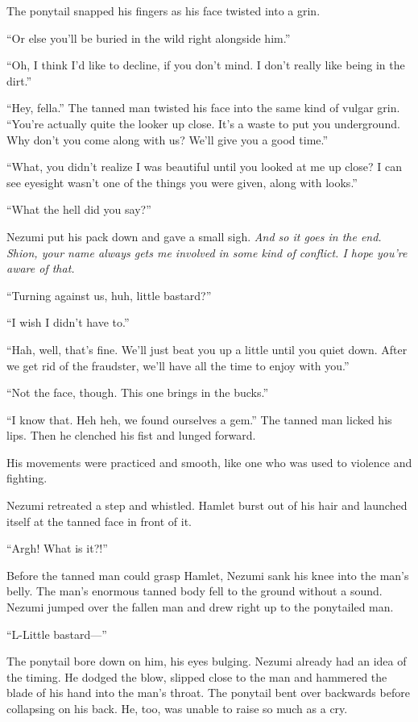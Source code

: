 The ponytail snapped his fingers as his face twisted into a grin.

``Or else you'll be buried in the wild right alongside him.''

``Oh, I think I'd like to decline, if you don't mind. I don't really
like being in the dirt.''

``Hey, fella.'' The tanned man twisted his face into the same kind of
vulgar grin. ``You're actually quite the looker up close. It's a waste
to put you underground. Why don't you come along with us? We'll give you
a good time.''

``What, you didn't realize I was beautiful until you looked at me up
close? I can see eyesight wasn't one of the things you were given, along
with looks.''

``What the hell did you say?''

Nezumi put his pack down and gave a small sigh. \emph{And so it goes in the
end. Shion, your name always gets me involved in some kind of conflict.
I hope you're aware of that.}

``Turning against us, huh, little bastard?''

``I wish I didn't have to.''

``Hah, well, that's fine. We'll just beat you up a little until you
quiet down. After we get rid of the fraudster, we'll have all the time
to enjoy with you.''

``Not the face, though. This one brings in the bucks.''

``I know that. Heh heh, we found ourselves a gem.'' The tanned man
licked his lips. Then he clenched his fist and lunged forward.~

His movements were practiced and smooth, like one who was used to
violence and fighting.

Nezumi retreated a step and whistled. Hamlet burst out of his hair and
launched itself at the tanned face in front of it.

``Argh! What is it?!''

Before the tanned man could grasp Hamlet, Nezumi sank his knee into the
man's belly. The man's enormous tanned body fell to the ground without a
sound. Nezumi jumped over the fallen man and drew right up to the
ponytailed man.

``L-Little bastard---''

The ponytail bore down on him, his eyes bulging. Nezumi already had an
idea of the timing. He dodged the blow, slipped close to the man and
hammered the blade of his hand into the man's throat. The ponytail bent
over backwards before collapsing on his back. He, too, was unable to
raise so much as a cry.

